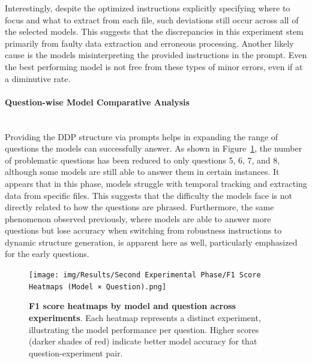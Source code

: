 \documentclass{DESSThesis}
\begin{document}
Interestingly, despite the optimized instructions explicitly specifying where to focus and what to extract from each file, such deviations still occur across all of the selected models. This suggests that the discrepancies in this experiment stem primarily from faulty data extraction and erroneous processing. Another likely cause is the models misinterpreting the provided instructions in the prompt. Even the best performing model is not free from these types of minor errors, even if at a diminutive rate.

\paragraph{Question-wise Model Comparative Analysis}\mbox{}\\

\noindent Providing the DDP structure via prompts helps in expanding the range of questions the models can successfully answer. As shown in Figure~\ref{fig:f1_score_heatmap_second}, the number of problematic questions has been reduced to only questions 5, 6, 7, and 8, although some models are still able to answer them in certain instances. It appears that in this phase, models struggle with temporal tracking and extracting data from specific files. This suggests that the difficulty the models face is not directly related to how the questions are phrased. Furthermore, the same phenomenon observed previously, where models are able to answer more questions but lose accuracy when switching from robustness instructions to dynamic structure generation, is apparent here as well, particularly emphasized for the early questions.

\begin{figure}[ht]
    \centering
    \texttt{[image: img/Results/Second Experimental Phase/F1 Score Heatmaps (Model × Question).png]}
    \caption[F1 score heatmaps by model and question across experiments]{\textbf{F1 score heatmaps by model and question across experiments}. Each heatmap represents a distinct experiment, illustrating the model performance per question. Higher scores (darker shades of red) indicate better model accuracy for that question-experiment pair.}
    \label{fig:f1_score_heatmap_second}
\end{figure}
\end{document}
